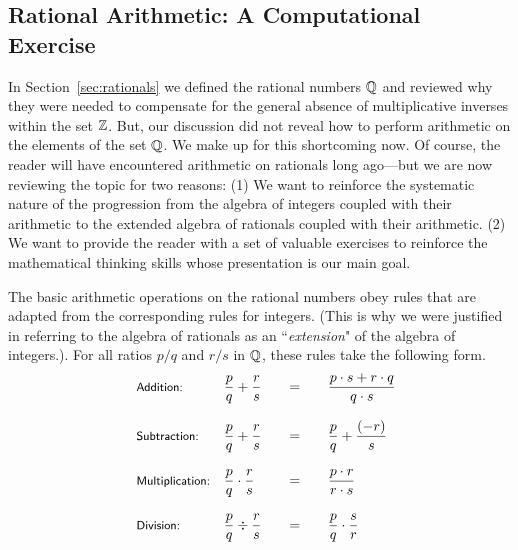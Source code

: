 \subsection{Rational Arithmetic: A Computational Exercise}
\label{sec:Rational-arithmetic}

In Section~\ref{sec:rationals} we defined the rational numbers $\mathbb{Q}$ and reviewed why they were needed to compensate for the general absence of multiplicative inverses within the set $\mathbb{Z}$.  But, our discussion did not reveal how to perform arithmetic on the elements of the set $\mathbb{Q}$.
We make up for this shortcoming now.  Of course, the reader will have encountered arithmetic on rationals long ago---but we are now reviewing the topic for two reasons:  (1) We want to reinforce the systematic nature of the progression from the algebra of integers coupled with their arithmetic to the extended algebra of rationals coupled with their arithmetic.  (2) We want to provide the reader with a set of valuable exercises to reinforce the mathematical thinking skills whose presentation is our main goal.

\medskip

The basic arithmetic operations on the rational numbers obey rules that are adapted from the corresponding rules for integers.  (This is why we were justified in referring to the algebra of rationals as an ``{\em extension}" of the algebra of integers.). For all ratios $p/q$ and $r/s$ in $\mathbb{Q}$, these rules take the following form.
\[
\begin{array}{llcccl}
\mbox{\small\sf Addition:} & 
{\displaystyle
{p \over q} + {r \over s} }
  & & = & &
{\displaystyle
 \frac{p \cdot s + r \cdot q}{q \cdot s} }  \\
 & & & & & \\
\mbox{\small\sf Subtraction:} &
{\displaystyle
{p \over q} + {r \over s} }
  & & = & &
{\displaystyle
{p \over q} + {(-r) \over s} } \\
 & & & & & \\
\mbox{\small\sf Multiplication:} &
{\displaystyle
{p \over q} \cdot {r \over s} }
  & & = & &
{\displaystyle
\frac{p \cdot r}{r \cdot s} } \\
  & & & & & \\
\mbox{\small\sf Division:} &
{\displaystyle
{p \over q} \div {r \over s} }
  & & = & &
{\displaystyle
{p \over q} \cdot {s \over r} }
\end{array}
\]

\smallskip


